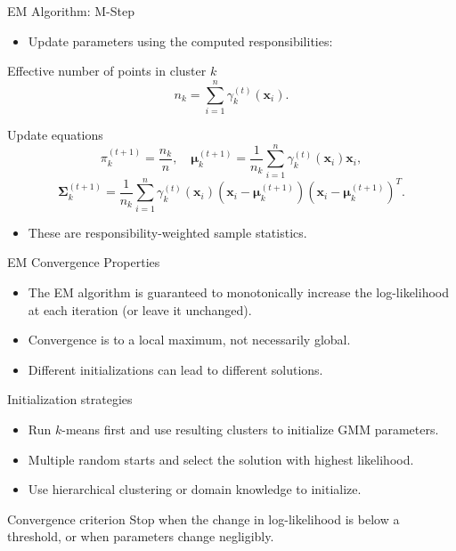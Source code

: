 \begin{frame}{EM Algorithm: M-Step}
  \begin{itemize}
    \item Update parameters using the computed responsibilities:
  \end{itemize}
  \begin{block}{Effective number of points in cluster $k$}
    \[
    n_k = \sum_{i=1}^{n} \gamma_k^{(t)}(\mathbf{x}_i).
    \]
  \end{block}
  \begin{block}{Update equations}
    \[
    \pi_k^{(t+1)} = \frac{n_k}{n}, \quad
    \boldsymbol{\mu}_k^{(t+1)} = \frac{1}{n_k}\sum_{i=1}^{n} \gamma_k^{(t)}(\mathbf{x}_i)
                                 \mathbf{x}_i,
    \]
    \[
    \boldsymbol{\Sigma}_k^{(t+1)} = \frac{1}{n_k}\sum_{i=1}^{n} \gamma_k^{(t)}(\mathbf{x}_i)
                                    (\mathbf{x}_i - \boldsymbol{\mu}_k^{(t+1)})
                                    (\mathbf{x}_i - \boldsymbol{\mu}_k^{(t+1)})^T.
    \]
  \end{block}
  \begin{itemize}
    \item These are \alert{responsibility-weighted} sample statistics.
  \end{itemize}
\end{frame}

\begin{frame}{EM Convergence Properties}
  \begin{itemize}
    \item The EM algorithm is guaranteed to \alert{monotonically increase} the log-likelihood
          at each iteration (or leave it unchanged).
    \item Convergence is to a \alert{local maximum}, not necessarily global.
    \item Different initializations can lead to different solutions.
  \end{itemize}
  \begin{block}{Initialization strategies}
    \begin{itemize}
      \item Run $k$-means first and use resulting clusters to initialize GMM parameters.
      \item Multiple random starts and select the solution with highest likelihood.
      \item Use hierarchical clustering or domain knowledge to initialize.
    \end{itemize}
  \end{block}
  \begin{alertblock}{Convergence criterion}
    Stop when the change in log-likelihood is below a threshold, or when parameters
    change negligibly.
  \end{alertblock}
\end{frame}

